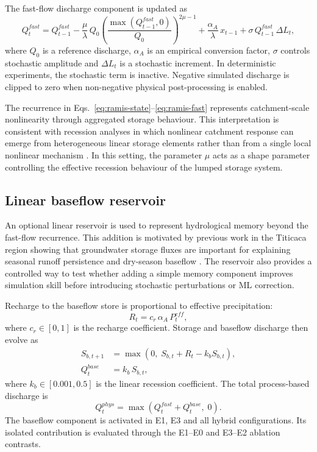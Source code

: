 \documentclass[a4paper,fleqn]{cas-sc}
\begin{document}
The fast-flow discharge component is updated as
\begin{equation}
Q^{fast}_t = Q^{fast}_{t-1}
  - \frac{\mu}{\lambda}\,Q_0
    \left(\frac{\max(Q^{fast}_{t-1},0)}{Q_0}\right)^{2\mu-1}
  + \frac{\alpha_A}{\lambda}\,x_{t-1}
  + \sigma\,Q^{fast}_{t-1}\,\Delta L_t,
\label{eq:ramis-fast}
\end{equation}
where $Q_0$ is a reference discharge, $\alpha_A$ is an empirical
conversion factor, $\sigma$ controls stochastic amplitude and
$\Delta L_t$ is a stochastic increment. In deterministic experiments,
the stochastic term is inactive. Negative simulated discharge is clipped
to zero when non-negative physical post-processing is enabled.

The recurrence in Eqs.~\ref{eq:ramis-state}--\ref{eq:ramis-fast}
represents catchment-scale nonlinearity through aggregated storage
behaviour. This interpretation is consistent with recession analyses in
which nonlinear catchment response can emerge from heterogeneous linear
storage elements rather than from a single local nonlinear mechanism
\citep{harman2009power}. In this setting, the parameter $\mu$ acts as a
shape parameter controlling the effective recession behaviour of the
lumped storage system.

\subsection{Linear baseflow reservoir}\label{subsec:baseflow}

An optional linear reservoir is used to represent hydrological memory
beyond the fast-flow recurrence. This addition is motivated by previous
work in the Titicaca region showing that groundwater storage fluxes are
important for explaining seasonal runoff persistence and dry-season
baseflow \citep{nauditt2017conceptual}. The reservoir also provides a
controlled way to test whether adding a simple memory component improves
simulation skill before introducing stochastic perturbations or ML
correction.

Recharge to the baseflow store is proportional to effective
precipitation:
\begin{equation}
R_t = c_r\,\alpha_A\,P^{eff}_t,
\label{eq:recharge}
\end{equation}
where $c_r\in[0,1]$ is the recharge coefficient. Storage and baseflow
discharge then evolve as
\begin{align}
S_{b,t+1} &= \max\!\left(0,\;S_{b,t} + R_t - k_b S_{b,t}\right),
\label{eq:storage}\\
Q^{base}_t &= k_b\,S_{b,t},
\label{eq:qbase}
\end{align}
where $k_b\in[0.001,0.5]$ is the linear recession coefficient. The
total process-based discharge is
\begin{equation}
Q^{phys}_t = \max\!\left(Q^{fast}_t + Q^{base}_t,\;0\right).
\label{eq:qtotal}
\end{equation}
The baseflow component is activated in E1, E3 and all hybrid
configurations. Its isolated contribution is evaluated through the
E1--E0 and E3--E2 ablation contrasts.
\end{document}
